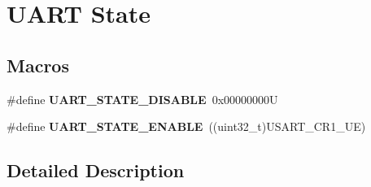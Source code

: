 \hypertarget{group___u_a_r_t___state}{}\section{U\+A\+RT State}
\label{group___u_a_r_t___state}
\subsection*{Macros}
\begin{DoxyCompactItemize}
\item 
\mbox{\label{group___u_a_r_t___state_gaf32492459be708981ebc5615194cdae9}} 
\#define {\bfseries U\+A\+R\+T\+\_\+\+S\+T\+A\+T\+E\+\_\+\+D\+I\+S\+A\+B\+LE}~0x00000000U
\item 
\mbox{\label{group___u_a_r_t___state_gab6b470dccef2a518a45554b171acff5b}} 
\#define {\bfseries U\+A\+R\+T\+\_\+\+S\+T\+A\+T\+E\+\_\+\+E\+N\+A\+B\+LE}~((uint32\+\_\+t)U\+S\+A\+R\+T\+\_\+\+C\+R1\+\_\+\+UE)
\end{DoxyCompactItemize}


\subsection{Detailed Description}
